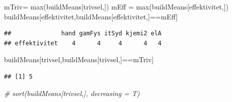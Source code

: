 \documentclass[
]{article}
\newenvironment{Shaded}{\begin{snugshade}}{\end{snugshade}}
\newcommand{\CommentTok}[1]{\textcolor[rgb]{0.56,0.35,0.01}{\textit{#1}}}
\newcommand{\FunctionTok}[1]{\textcolor[rgb]{0.00,0.00,0.00}{#1}}
\newcommand{\NormalTok}[1]{#1}
\newcommand{\OtherTok}[1]{\textcolor[rgb]{0.56,0.35,0.01}{#1}}
\newcommand{\SpecialCharTok}[1]{\textcolor[rgb]{0.00,0.00,0.00}{#1}}
\newcommand{\StringTok}[1]{\textcolor[rgb]{0.31,0.60,0.02}{#1}}
\begin{document}
\begin{Shaded}
\begin{Highlighting}[]

\NormalTok{mTriv}\OtherTok{=} \FunctionTok{max}\NormalTok{(buildMeans[}\StringTok{\textquotesingle{}trivsel\textquotesingle{}}\NormalTok{,])}
\NormalTok{mEff }\OtherTok{=} \FunctionTok{max}\NormalTok{(buildMeans[}\StringTok{\textquotesingle{}effektivitet\textquotesingle{}}\NormalTok{,])}
\NormalTok{buildMeans[}\StringTok{\textquotesingle{}effektivitet\textquotesingle{}}\NormalTok{,buildMeans[}\StringTok{\textquotesingle{}effektivitet\textquotesingle{}}\NormalTok{,]}\SpecialCharTok{==}\NormalTok{mEff]}
\end{Highlighting}
\end{Shaded}

\begin{verbatim}
##              hand gamFys itSyd kjemi2 elA
## effektivitet    4      4     4      4   4
\end{verbatim}

\begin{Shaded}
\begin{Highlighting}[]
\NormalTok{buildMeans[}\StringTok{\textquotesingle{}trivsel\textquotesingle{}}\NormalTok{,buildMeans[}\StringTok{\textquotesingle{}trivsel\textquotesingle{}}\NormalTok{,]}\SpecialCharTok{==}\NormalTok{mTriv]}
\end{Highlighting}
\end{Shaded}

\begin{verbatim}
## [1] 5
\end{verbatim}

\begin{Shaded}
\begin{Highlighting}[]

\CommentTok{\# sort(buildMeans[\textquotesingle{}trivsel\textquotesingle{},], decreasing = T)}
\end{Highlighting}
\end{Shaded}
\end{document}
